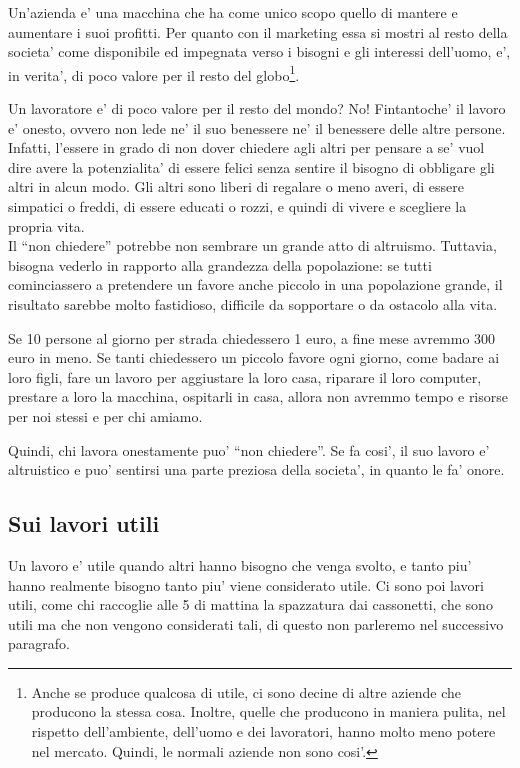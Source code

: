 Un'azienda e' una macchina che ha come unico scopo quello di mantere e aumentare i suoi profitti. Per quanto con il marketing essa si mostri al resto della societa' come disponibile ed impegnata verso i bisogni e gli interessi dell'uomo, e', in verita', di poco valore per il resto del globo\footnote{Anche se produce qualcosa di utile, ci sono decine di altre aziende che producono la stessa cosa. Inoltre, quelle che producono in maniera pulita, nel rispetto dell'ambiente, dell'uomo e dei lavoratori, hanno molto meno potere nel mercato. Quindi, le normali aziende non sono cosi'.}.

Un lavoratore e' di poco valore per il resto del mondo?
No! Fintantoche' il lavoro e' onesto, ovvero non lede ne' il suo benessere ne' il benessere delle altre persone.\\
Infatti, l'essere in grado di non dover chiedere agli altri per pensare a se' vuol dire avere la potenzialita' di essere felici senza sentire il bisogno di obbligare gli altri in alcun modo. Gli altri sono liberi di regalare o meno averi, di essere simpatici o freddi, di essere educati o rozzi, e quindi di vivere e scegliere la propria vita.\\
Il ``non chiedere'' potrebbe non sembrare un grande atto di altruismo. Tuttavia, bisogna vederlo in rapporto alla grandezza della popolazione: se tutti cominciassero a pretendere un favore anche piccolo in una popolazione grande, il risultato sarebbe molto fastidioso, difficile da sopportare o da ostacolo alla vita.

Se 10 persone al giorno per strada chiedessero 1 euro, a fine mese avremmo 300 euro in meno. Se tanti chiedessero un piccolo favore ogni giorno, come badare ai loro figli, fare un lavoro per aggiustare la loro casa, riparare il loro computer, prestare a loro la macchina, ospitarli in casa, allora non avremmo tempo e risorse per noi stessi e per chi amiamo.

Quindi, chi lavora onestamente puo' ``non chiedere''. Se fa cosi', il suo lavoro e' altruistico e puo' sentirsi una parte preziosa della societa', in quanto le fa' onore.

\subsection{Sui lavori utili}
Un lavoro e' utile quando altri hanno bisogno che venga svolto, e tanto piu' hanno realmente bisogno tanto piu' viene considerato utile. Ci sono poi lavori utili, come chi raccoglie alle 5 di mattina la spazzatura dai cassonetti, che sono utili ma che non vengono considerati tali, di questo non parleremo nel successivo paragrafo.

